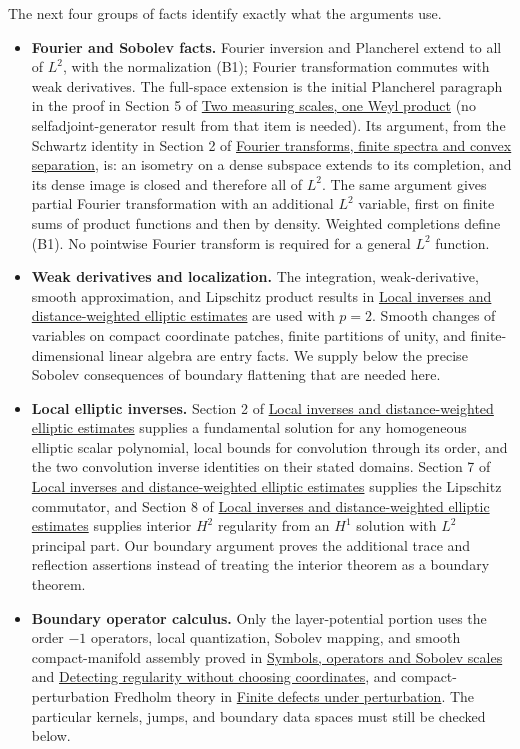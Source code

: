 \documentclass[
  11pt,
]{article}
\providecommand{\tightlist}{%
  \setlength{\itemsep}{0pt}\setlength{\parskip}{0pt}}
\begin{document}
The next four groups of facts identify exactly what the arguments use.

\begin{itemize}
\tightlist
\item
  \textbf{Fourier and Sobolev facts.} Fourier inversion and Plancherel
  extend to all of \(L^2\), with the normalization (B1); Fourier
  transformation commutes with weak derivatives. The full-space
  extension is the initial Plancherel paragraph in the proof in Section
  5 of \href{weyl-metric-products.pdf}{Two measuring scales, one Weyl
  product} (no selfadjoint-generator result from that item is needed).
  Its argument, from the Schwartz identity in Section 2 of
  \href{prerequisite-bridges.pdf}{Fourier transforms, finite spectra and
  convex separation}, is: an isometry on a dense subspace extends to its
  completion, and its dense image is closed and therefore all of
  \(L^2\). The same argument gives partial Fourier transformation with
  an additional \(L^2\) variable, first on finite sums of product
  functions and then by density. Weighted completions define (B1). No
  pointwise Fourier transform is required for a general \(L^2\)
  function.
\item
  \textbf{Weak derivatives and localization.} The integration,
  weak-derivative, smooth approximation, and Lipschitz product results
  in \href{local-elliptic-coefficients.pdf}{Local inverses and
  distance-weighted elliptic estimates} are used with \(p=2\). Smooth
  changes of variables on compact coordinate patches, finite partitions
  of unity, and finite-dimensional linear algebra are entry facts. We
  supply below the precise Sobolev consequences of boundary flattening
  that are needed here.
\item
  \textbf{Local elliptic inverses.} Section 2 of
  \href{local-elliptic-coefficients.pdf}{Local inverses and
  distance-weighted elliptic estimates} supplies a fundamental solution
  for any homogeneous elliptic scalar polynomial, local bounds for
  convolution through its order, and the two convolution inverse
  identities on their stated domains. Section 7 of
  \href{local-elliptic-coefficients.pdf}{Local inverses and
  distance-weighted elliptic estimates} supplies the Lipschitz
  commutator, and Section 8 of
  \href{local-elliptic-coefficients.pdf}{Local inverses and
  distance-weighted elliptic estimates} supplies interior \(H^2\)
  regularity from an \(H^1\) solution with \(L^2\) principal part. Our
  boundary argument proves the additional trace and reflection
  assertions instead of treating the interior theorem as a boundary
  theorem.
\item
  \textbf{Boundary operator calculus.} Only the layer-potential portion
  uses the order \(-1\) operators, local quantization, Sobolev mapping,
  and smooth compact-manifold assembly proved in
  \href{euclidean-symbol-calculus.pdf}{Symbols, operators and Sobolev
  scales} and \href{geometric-microlocal-calculus.pdf}{Detecting
  regularity without choosing coordinates}, and compact-perturbation
  Fredholm theory in \href{fredholm-stability.pdf}{Finite defects under
  perturbation}. The particular kernels, jumps, and boundary data spaces
  must still be checked below.
\end{itemize}
\end{document}
